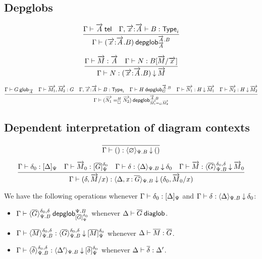 \subsection{Depglobs}

\begin{small}
\[
\infer
  {\wfdepglob{\Gamma}{(\tel{x}{:}\tel{A}.B)}{\tel{A}.B}{\tel{A}}}
  {\wftel{\Gamma}{\tel{A}}
  &\wftype{\Gamma,\tel{x}{:}\tel{A}}{B}}
\]

\[
\infer
  {\ofdepglob{\Gamma}{N}{(\tel{x}{:}\tel{A}.B)}{\tel{M}}}
  {\ofglob{\Gamma}{\tel{M}}{\tel{A}}
  &\ofglob{\Gamma}{N}{B[\tel{M}/\tel{x}]}}
\]

  \[\infer{\wfdepglob{\Gamma}{(\dhomj{H}{\tel{N_1}}{\tel{N_2}}{\blank})}
    {\tel{A}.B}{\homj{G}{\tel{M_1}}{\tel{M_2}}}}
  {\wfglob{\Gamma}{G}{\tel{A}}
    & \ofglob{\Gamma}{\tel{M_1},\tel{M_2}}{G}
    & \wftype{\Gamma,\tel{x}{:}\tel{A}}{B}
    & \wfdepglob{\Gamma}{H}{\tel{A}.B}{G}
    & \ofdepglob{\Gamma}{\tel{N_1}}{H}{\tel{M_1}}
    & \ofdepglob{\Gamma}{\tel{N_2}}{H}{\tel{M_2}}}\]
\end{small}

\subsection{Dependent interpretation of diagram contexts}

\[\infer
  {\ofinterpdep{\Gamma}{()}{\emptyctx}{\Psi.B}{()}}
  {}
\]

\[
\infer
  {\ofinterpdep{\Gamma}{(\delta,\tel M/x)}
   {\Delta,\tptm{x}{\diag G}}{\Psi.B}{(\delta_0,\tel M_0/x)}}
  {\ofinterp{\Gamma}{\delta_0}{\Delta}{\Psi}
  & \ofglob{\Gamma}{\tel M_0}{\interpglob{\diag G}{\Psi}{\delta_0}}
  & \ofinterpdep{\Gamma}{\delta}{\Delta}{\Psi.B}{\delta_0}
  & \ofdepglob{\Gamma}{\tel M}{\interpdepglob{\diag G}{\Psi.B}{\delta_0}{\delta}}{\tel M_0}}
\]

We have the following operations whenever
${\Gamma} \vdash {\delta_0} : {[ \Delta ]_{\Psi}}$ and
${\Gamma} \vdash {\delta} : {\langle \Delta \rangle_{\Psi.B}}\mathbin{\downarrow}{\delta_0}$:

\begin{itemize}
\item
${\Gamma} \vdash {\langle {\ensuremath{\overline{G}}}\rangle_{\Psi.B}^{\delta_0,\delta}} \: \mathsf{depglob}^{\Psi.B}_{[{\overline{G}}]_{\Psi}^{\delta_0}}$
whenever
${\Delta} \vdash {\ensuremath{\overline{G}}} \: \mathsf{diaglob}$.

\item
${\Gamma} \vdash {\langle {\ensuremath{\overline{M}}}\rangle_{\Psi.B}^{\delta_0,\delta}} : {\langle {\ensuremath{\overline{G}}}\rangle_{\Psi.B}^{\delta_0,\delta}}\mathbin{\downarrow}{[{\overline{M}}]_{\Psi}^{\delta_0}}$
whenever
${\Delta} \vdash {\ensuremath{\overline{M}}} : {\overline{G}}$.

\item
${\Gamma} \vdash {\langle {\ensuremath{\overline{\delta}}}\rangle_{\Psi.B}^{\delta_0,\delta}} : {\langle \Delta' \rangle_{\Psi.B}}\mathbin{\downarrow}{[{\overline{\delta}}]_{\Psi}^{\delta_0}}$
whenever
${\Delta} \vdash {\ensuremath{\overline{\delta}}} : {\Delta'}$.
\end{itemize}

